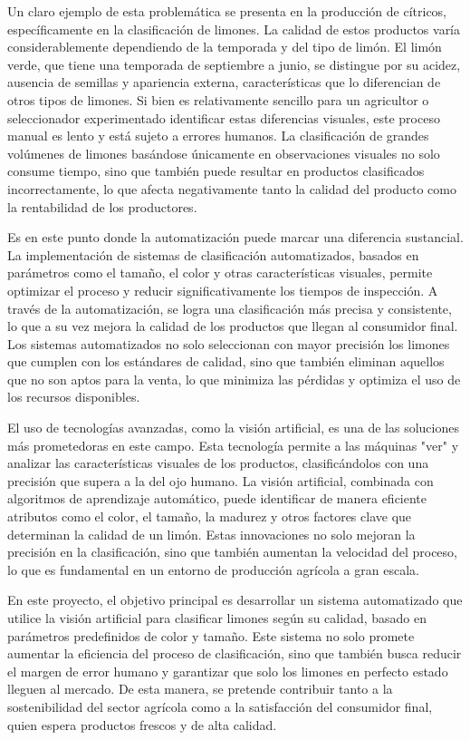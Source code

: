 Un claro ejemplo de esta problemática se presenta en la producción de cítricos, específicamente en la clasificación de limones. La calidad de estos productos varía considerablemente dependiendo de la temporada y del tipo de limón. El limón verde, que tiene una temporada de septiembre a junio, se distingue por su acidez, ausencia de semillas y apariencia externa, características que lo diferencian de otros tipos de limones. Si bien es relativamente sencillo para un agricultor o seleccionador experimentado identificar estas diferencias visuales, este proceso manual es lento y está sujeto a errores humanos. La clasificación de grandes volúmenes de limones basándose únicamente en observaciones visuales no solo consume tiempo, sino que también puede resultar en productos clasificados incorrectamente, lo que afecta negativamente tanto la calidad del producto como la rentabilidad de los productores.

Es en este punto donde la automatización puede marcar una diferencia sustancial. La implementación de sistemas de clasificación automatizados, basados en parámetros como el tamaño, el color y otras características visuales, permite optimizar el proceso y reducir significativamente los tiempos de inspección. A través de la automatización, se logra una clasificación más precisa y consistente, lo que a su vez mejora la calidad de los productos que llegan al consumidor final. Los sistemas automatizados no solo seleccionan con mayor precisión los limones que cumplen con los estándares de calidad, sino que también eliminan aquellos que no son aptos para la venta, lo que minimiza las pérdidas y optimiza el uso de los recursos disponibles.

El uso de tecnologías avanzadas, como la visión artificial, es una de las soluciones más prometedoras en este campo. Esta tecnología permite a las máquinas "ver" y analizar las características visuales de los productos, clasificándolos con una precisión que supera a la del ojo humano. La visión artificial, combinada con algoritmos de aprendizaje automático, puede identificar de manera eficiente atributos como el color, el tamaño, la madurez y otros factores clave que determinan la calidad de un limón. Estas innovaciones no solo mejoran la precisión en la clasificación, sino que también aumentan la velocidad del proceso, lo que es fundamental en un entorno de producción agrícola a gran escala.

En este proyecto, el objetivo principal es desarrollar un sistema automatizado que utilice la visión artificial para clasificar limones según su calidad, basado en parámetros predefinidos de color y tamaño. Este sistema no solo promete aumentar la eficiencia del proceso de clasificación, sino que también busca reducir el margen de error humano y garantizar que solo los limones en perfecto estado lleguen al mercado. De esta manera, se pretende contribuir tanto a la sostenibilidad del sector agrícola como a la satisfacción del consumidor final, quien espera productos frescos y de alta calidad.

